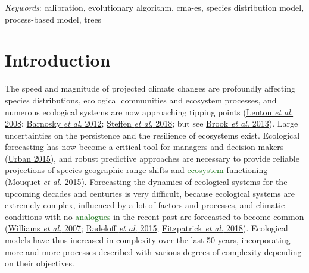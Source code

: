 \documentclass[11pt,]{article}
\renewenvironment{abstract}
 {{%
    \setlength{\leftmargin}{0mm}
    \setlength{\rightmargin}{\leftmargin}%
  }%
  \relax}
 {\endlist}
\begin{document}
\begin{abstract}
\vskip 8.5pt \noindent \emph{Keywords}: calibration, evolutionary
algorithm, cma-es, species distribution model, process-based model,
trees \par

    \hbox{\vrule height .2pt width 39.14pc}



\end{abstract}


\vskip -8.5pt



\noindent \doublespacing

\hypertarget{introduction}{%
\section{Introduction}\label{introduction}}

The speed and magnitude of projected climate changes are profoundly
affecting species distributions, ecological communities and ecosystem
processes, and numerous ecological systems are now approaching tipping
points (\protect\hyperlink{ref-Lenton2008}{Lenton \emph{et al.} 2008};
\protect\hyperlink{ref-Barnosky2012}{Barnosky \emph{et al.} 2012};
\protect\hyperlink{ref-Steffen2018}{Steffen \emph{et al.} 2018}; but see
\protect\hyperlink{ref-Brook2013}{Brook \emph{et al.} 2013}). Large
uncertainties on the persistence and the resilience of ecosystems exist.
Ecological forecasting has now become a critical tool for managers and
decision-makers (\protect\hyperlink{ref-Urban2015}{Urban 2015}), and
robust predictive approaches are necessary to provide reliable
projections of species geographic range shifts and
\textcolor{darkgreen}{ecosystem} functioning
(\protect\hyperlink{ref-Mouquet2015}{Mouquet \emph{et al.} 2015}).
Forecasting the dynamics of ecological systems for the upcoming decades
and centuries is very difficult, because ecological systems are
extremely complex, influenced by a lot of factors and processes, and
climatic conditions with no \textcolor{darkgreen}{analogues} in the
recent past are forecasted to become common
(\protect\hyperlink{ref-Williams2007}{Williams \emph{et al.} 2007};
\protect\hyperlink{ref-Radeloff2015}{Radeloff \emph{et al.} 2015};
\protect\hyperlink{ref-Fitzpatrick2018}{Fitzpatrick \emph{et al.}
2018}). Ecological models have thus increased in complexity over the
last 50 years, incorporating more and more processes described with
various degrees of complexity depending on their objectives.
\end{document}
